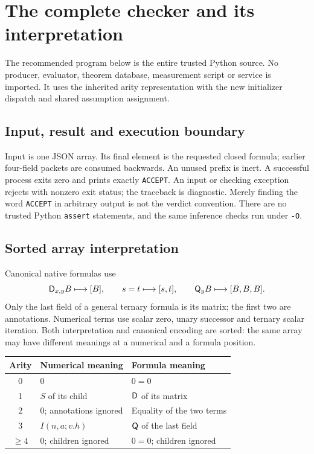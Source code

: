 \section{The complete checker and its interpretation}
\label{sec:checker}

The recommended program below is the entire trusted Python source.
No producer, evaluator, theorem database, measurement script or service
is imported. It uses the inherited arity representation \cite{arity}
with the new initializer dispatch and shared assumption assignment.



\subsection{Input, result and execution boundary}

Input is one JSON array. Its final element is the requested closed
formula; earlier four-field packets are consumed backwards. An unused
prefix is inert. A successful process exits zero and prints exactly
\texttt{ACCEPT}. An input or checking exception rejects with nonzero
exit status; the traceback is diagnostic. Merely finding the word
\texttt{ACCEPT} in arbitrary output is not the verdict convention.
There are no trusted Python \texttt{assert} statements, and the same
inference checks run under \texttt{-O}.

\subsection{Sorted array interpretation}

Canonical native formulas use
\[
       \mathsf D_{x,y}B\longmapsto[B],\qquad
       s=t\longmapsto[s,t],\qquad
       \mathsf Q_yB\longmapsto[B,B,B].
\]
Only the last field of a general ternary formula is its matrix; the
first two are annotations. Numerical terms use scalar zero, unary
successor and ternary scalar iteration. Both interpretation and
canonical encoding are sorted: the same array may have different
meanings at a numerical and a formula position.

\begin{center}
\begin{tabular}{cll}
\toprule
Arity & Numerical meaning & Formula meaning\\
\midrule
0 & $0$ & $0=0$\\
1 & $S$ of its child & $\mathsf D$ of its matrix\\
2 & $0$; annotations ignored & Equality of the two terms\\
3 & $I(n,a;v.h)$ & $\mathsf Q$ of the last field\\
$\geq4$ & $0$; children ignored & $0=0$; children ignored\\
\bottomrule
\end{tabular}
\end{center}

